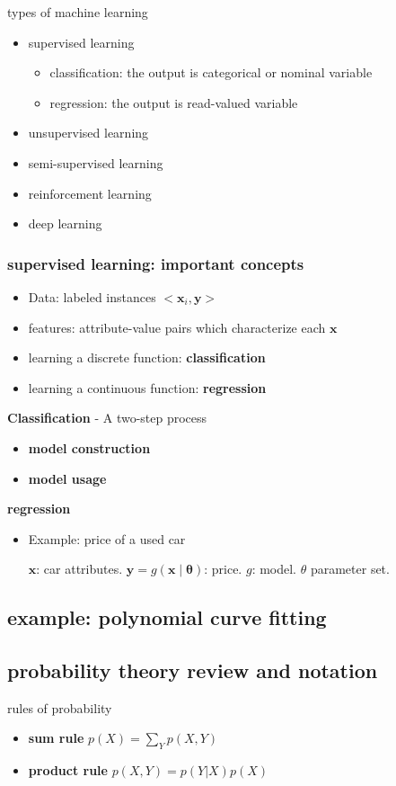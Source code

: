 \documentclass[11pt]{article}
\newcommand{\bl}[1] {\boldsymbol{#1}}
\begin{document}
types of machine learning
\begin{itemize}
\item supervised learning
\begin{itemize}
\item classification: the output is categorical or nominal variable
\item regression: the output is read-valued variable
\end{itemize}
\item unsupervised learning
\item semi-supervised learning
\item reinforcement learning
\item deep learning
\end{itemize}
\subsubsection{supervised learning: important concepts}
\label{sec:org88d88e7}
\begin{itemize}
\item Data: labeled instances \(<\bl{x}_i,\bl{y}>\)
\item features: attribute-value pairs which characterize each \(\bl{x}\)
\item learning a discrete function: \textbf{classification}
\item learning a continuous function: \textbf{regression}
\end{itemize}

\textbf{Classification} - A two-step process
\begin{itemize}
\item \textbf{model construction}
\item \textbf{model usage}
\end{itemize}

\textbf{regression}
\begin{itemize}
\item Example: price of a used car

\(\bl{x}\): car attributes. \(\bl{y}=g(\bl{x}\mid\bl{\theta})\): price. \(g\):
model. \(\theta\) parameter set.
\end{itemize}
\subsection{example: polynomial curve fitting}
\label{sec:org97bf6ea}
\subsection{probability theory review and notation}
\label{sec:org861f6ea}
rules of probability
\begin{itemize}
\item \textbf{sum rule} \(p(X)=\displaystyle\sum_Yp(X,Y)\)
\item \textbf{product rule} \(p(X,Y)=p(Y|X)p(X)\)
\end{itemize}
\end{document}
